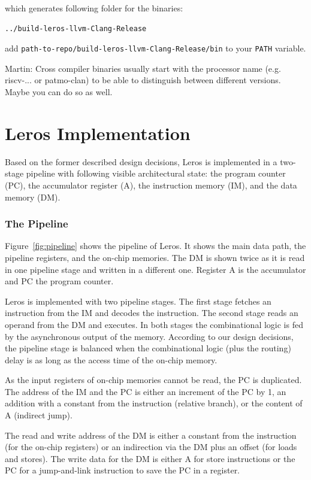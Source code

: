 \documentclass[a4paper,fontsize=10pt,twoside,DIV15,BCOR12mm,headinclude=true,footinclude=false,pagesize,bibtotoc]{scrbook}
\newcommand{\code}[1]{{\small{\texttt{#1}}}}
\newcommand{\martin}[1]{{\color{blue} Martin: #1}}
\begin{document}
which generates following folder for the binaries:

\begin{verbatim}
../build-leros-llvm-Clang-Release
\end{verbatim}

add \code{path-to-repo/build-leros-llvm-Clang-Release/bin} to your \code{PATH} variable.

\martin{Cross compiler binaries usually start with the processor name (e.g. riscv-... or patmo-clan)
to be able to distinguish between different versions. Maybe you can do so as well.}

\chapter{Leros Implementation}
\label{sec:imp}

Based on the former described design decisions, Leros is implemented in a two-stage pipeline with following visible architectural state: the program counter (PC), the accumulator register (A), the instruction memory (IM), and the data memory (DM).

\subsection{The Pipeline}

Figure~\ref{fig:pipeline} shows the pipeline of Leros. It shows the main data path, the pipeline registers, and the on-chip memories. The DM is shown twice as it is read in one pipeline stage and written in a different one. Register A is the accumulator and PC the program counter.

Leros is implemented with two pipeline stages. The first stage fetches an instruction from the IM and decodes the instruction. The second stage reads an operand from the DM and executes. In both stages the combinational logic is fed by the asynchronous output of the memory. According to our design decisions, the pipeline stage is balanced when the combinational logic (plus the routing) delay is as long as the access time of the on-chip memory.

As the input registers of on-chip memories cannot be read, the PC is duplicated. The address of the IM and the PC is either an increment of the PC by 1, an addition with a constant from the instruction (relative branch), or the content of A (indirect jump).

The read and write address of the DM is either a constant from the instruction (for the on-chip registers) or an indirection via the DM plus an offset (for loads and stores). The write data for the DM is either A for store instructions or the PC for a jump-and-link instruction to save the PC in a register.
\end{document}
